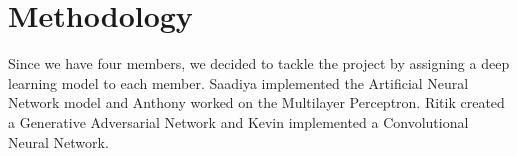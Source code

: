 \section{Methodology}
\label{sec:methodology}

Since we have four members, we decided to tackle the project by assigning a deep learning model to each member. Saadiya implemented the Artificial Neural Network model and Anthony worked on the Multilayer Perceptron. Ritik created a Generative Adversarial Network and Kevin implemented a Convolutional Neural Network.
